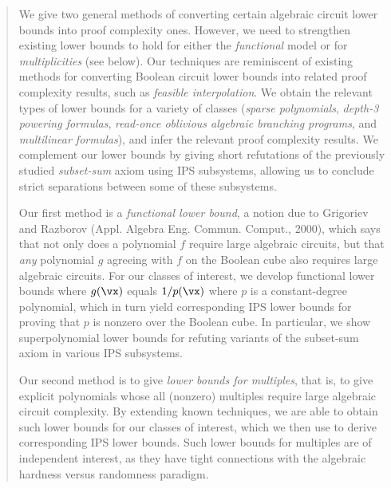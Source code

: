 \documentclass{toc}
\begin{document}
\begin{frontmatter}
\begin{abstract}
We give two general methods of converting certain algebraic circuit lower bounds into proof complexity ones. However, we need to strengthen existing lower bounds to hold for either the \emph{functional} model or for \emph{multiplicities} (see below). Our techniques are reminiscent of existing methods for converting Boolean circuit lower bounds into related proof complexity results, such as \emph{feasible interpolation}. We obtain the relevant types of lower bounds for a variety of classes (\emph{sparse polynomials}, \emph{depth-3 powering formulas}, \emph{read-once oblivious algebraic branching programs}, and \emph{multilinear formulas}), and infer the relevant proof complexity results. We complement our lower bounds by giving short refutations of the
%
previously studied   %
\emph{subset-sum} axiom using IPS subsystems, allowing us to conclude strict separations between some of these subsystems.


Our first method is a \emph{functional lower bound}, a notion due to
%
Grigoriev and Razborov (Appl. Algebra Eng. Commun. Comput., 2000),
%
which says that not only does a polynomial $f$ require large algebraic circuits, but that \emph{any} polynomial $g$
agreeing with $f$ on the Boolean cube also requires large algebraic circuits. For our classes of interest, we develop functional lower bounds where
$g(\vx)$ equals
%
$1/p(\vx)$ %
where $p$ is a constant-degree polynomial, which in turn yield corresponding IPS lower bounds for proving that $p$ is nonzero over the Boolean cube. In particular, we show superpolynomial lower bounds for refuting variants of the subset-sum axiom in various IPS subsystems. %

        Our second method is to give \emph{lower bounds for multiples}, that is, to give explicit polynomials whose all (nonzero) multiples require large algebraic circuit complexity. By extending known techniques, we are able to obtain such lower bounds for our classes of interest, which we then use to derive corresponding IPS lower bounds.  Such lower bounds for multiples are of independent interest, as they have tight connections with the algebraic hardness versus randomness paradigm.

\end{abstract}

%

\end{frontmatter}
\end{document}
